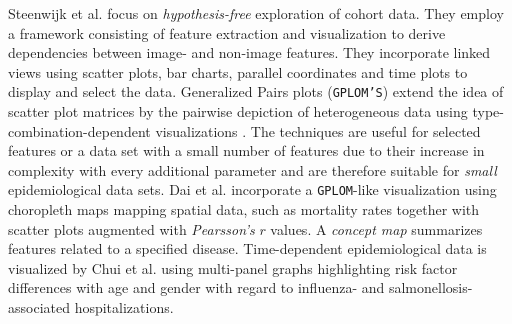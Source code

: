 \documentclass[journal]{style/vgtc} 			          %
\begin{document}
Steenwijk et al. \cite{Steenwijk} focus on \emph{hypothesis-free} exploration of cohort data.
They employ a framework consisting of feature extraction and visualization to derive dependencies between image- and non-image features.
They incorporate linked views using scatter plots, bar charts, parallel coordinates and time plots to display and select the data.
Generalized Pairs plots (\texttt{GPLOM'S}) extend the idea of scatter plot matrices by the pairwise depiction of heterogeneous data using type-combination-dependent visualizations \cite{GPLOMS, Francois2013}.
The techniques are useful for selected features or a data set with a small number of features due to their increase in complexity with every additional parameter and are therefore suitable for \emph{small} epidemiological data sets.
Dai et al. \cite{Dai2005} incorporate a \texttt{GPLOM}-like visualization using choropleth maps mapping spatial data, such as mortality rates together with scatter plots augmented with \emph{Pearsson's} $r$ values.
A \emph{concept map} summarizes features related to a specified disease.
Time-dependent epidemiological data is visualized by Chui et al. \cite{Chui2011} using multi-panel graphs highlighting risk factor differences with age and gender with regard to influenza- and salmonellosis-associated hospitalizations.
\end{document}
